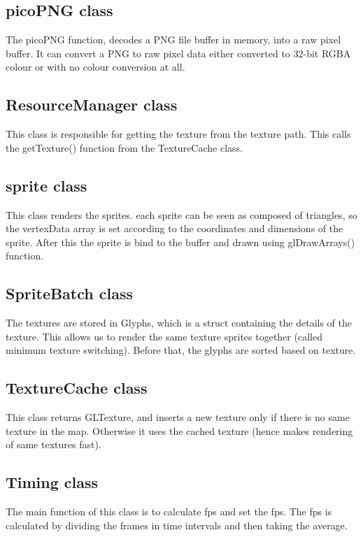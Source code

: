 \documentclass{article}
\begin{document}
\subsection{picoPNG class}
The picoPNG function, decodes a PNG file buffer in memory, into a raw pixel buffer. It can convert a PNG to raw pixel data either converted to 32-bit RGBA colour or with no colour conversion at all.
\newline

\subsection{ResourceManager class}
This class is responsible for getting the texture from the texture path. This calls the getTexture() function from the TextureCache class.
\newline

\subsection{sprite class}
This class renders the sprites. each sprite can be seen as composed of triangles, so the vertexData array is set according to the coordinates and dimensions of the sprite. After this the sprite is bind to the buffer and drawn using glDrawArrays() function.
\newline

\subsection{SpriteBatch class}
The textures are stored in Glyphs, which is a struct containing the details of the texture. This allows us to render the same texture sprites together (called minimum texture switching). Before that, the glyphs are sorted based on texture.
\newline

\subsection{TextureCache class}
This class returns GLTexture, and inserts a new texture only if there is no same texture in the map. Otherwise it uses the cached texture (hence makes rendering of same textures fast).
 \newline

\subsection{Timing class}
The main function of this class is to calculate fps and set the fps. The fps is calculated by dividing the frames in time intervals and then taking the average.
\newline
\end{document}
